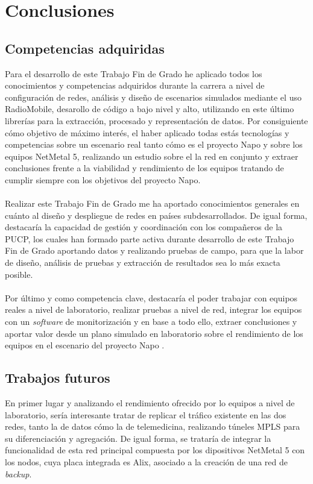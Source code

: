 \chapter{Conclusiones}
\label{cap:conclusion}

\section{Competencias adquiridas}
Para el desarrollo de este Trabajo Fin de Grado he aplicado todos los conocimientos y competencias adquiridos durante la carrera a nivel de configuración de redes, análisis y diseño de escenarios simulados mediante el uso RadioMobile, desarollo de código a bajo nivel y alto, utilizando en este último librerías para la extracción, procesado y representación de datos. Por consiguiente cómo objetivo de máximo interés, el haber aplicado todas estás tecnologías y competencias sobre un escenario real tanto cómo es el proyecto Napo y sobre los equipos NetMetal 5, realizando un estudio sobre el la red en conjunto y extraer conclusiones frente a la viabilidad y rendimiento de los equipos tratando de cumplir siempre con los objetivos del proyecto Napo.\\\\

Realizar este Trabajo Fin de Grado me ha aportado conocimientos generales en cuánto al diseño y despliegue de redes en países subdesarrollados. De igual forma, destacaría la capacidad de gestión y coordinación con los compañeros de la PUCP, los cuales han formado parte activa durante desarrollo de este Trabajo Fin de Grado aportando datos y realizando pruebas de campo, para que la labor de diseño, análisis de pruebas y extracción de resultados sea lo más exacta posible. \\\\

Por último y como competencia clave, destacaría el poder trabajar con equipos reales a nivel de laboratorio, realizar pruebas a nivel de red, integrar los equipos con un \textit{software} de monitorización y en base a todo ello, extraer conclusiones y aportar valor desde un plano simulado en laboratorio sobre el rendimiento de los equipos en el escenario del proyecto Napo .

\section{Trabajos futuros}
En primer lugar y analizando el rendimiento ofrecido por lo equipos a nivel de laboratorio, sería interesante tratar de replicar el tráfico existente en las dos redes, tanto la de datos cómo la de telemedicina, realizando túneles MPLS para su diferenciación y agregación. De igual forma, se trataría de integrar la funcionalidad de esta red principal compuesta por los dipositivos NetMetal 5 con los nodos, cuya placa integrada es Alix, asociado a la creación de una red de \textit{backup}.\\\\

